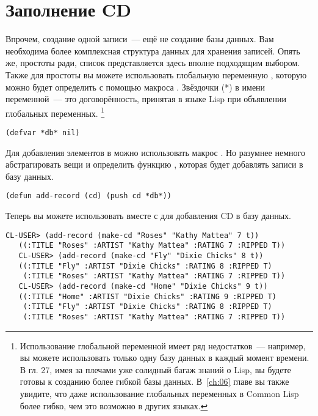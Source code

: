 \section{Заполнение CD}

Впрочем, создание одной записи~--- ещё не создание базы данных. Вам необходима более
комплексная структура данных для хранения записей. Опять же, простоты ради, список
представляется здесь вполне подходящим выбором. Также для простоты вы можете использовать
глобальную переменную , которую можно будет определить с помощью макроса
. Звёздочки (*) в имени переменной~--- это договорённость, принятая в языке
Lisp при объявлении глобальных переменных. \footnote{Использование глобальной переменной
  имеет ряд недостатков~--- например, вы можете использовать только одну базу данных в
  каждый момент времени. В гл. 27, имея за плечами уже солидный багаж знаний о Lisp, вы
  будете готовы к созданию более гибкой базы данных. В~\ref{ch:06} главе вы также увидите, что даже
  использование глобальных переменных в Common Lisp более гибко, чем это возможно в других
  языках.}

\begin{lstlisting}
(defvar *db* nil)
\end{lstlisting}

Для добавления элементов в  можно использовать макрос . Но
разумнее немного абстрагировать вещи и определить функцию , которая будет
добавлять записи в базу данных.

\begin{lstlisting}
(defun add-record (cd) (push cd *db*))
\end{lstlisting}

Теперь вы можете использовать  вместе с  для добавления CD
в базу данных.

\begin{lstlisting}[style=lisprepl]
   CL-USER> (add-record (make-cd "Roses" "Kathy Mattea" 7 t))
   ((:TITLE "Roses" :ARTIST "Kathy Mattea" :RATING 7 :RIPPED T))
   CL-USER> (add-record (make-cd "Fly" "Dixie Chicks" 8 t))
   ((:TITLE "Fly" :ARTIST "Dixie Chicks" :RATING 8 :RIPPED T)
    (:TITLE "Roses" :ARTIST "Kathy Mattea" :RATING 7 :RIPPED T))
   CL-USER> (add-record (make-cd "Home" "Dixie Chicks" 9 t))
   ((:TITLE "Home" :ARTIST "Dixie Chicks" :RATING 9 :RIPPED T)
    (:TITLE "Fly" :ARTIST "Dixie Chicks" :RATING 8 :RIPPED T)
    (:TITLE "Roses" :ARTIST "Kathy Mattea" :RATING 7 :RIPPED T))
\end{lstlisting}

